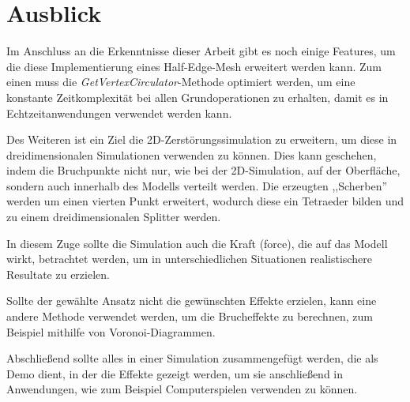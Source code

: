 \section{Ausblick}
Im Anschluss an die Erkenntnisse dieser Arbeit gibt es noch einige Features, um die diese Implementierung eines Half-Edge-Mesh erweitert werden kann. Zum einen muss die \textit{GetVertexCirculator}-Methode optimiert werden, um eine konstante Zeitkomplexit\"at bei allen Grundoperationen zu erhalten, damit es in Echtzeitanwendungen verwendet werden kann. 

Des Weiteren ist ein Ziel die 2D-Zerst\"orungssimulation zu erweitern, um diese in dreidimensionalen Simulationen verwenden zu k\"onnen. Dies kann geschehen, indem die Bruchpunkte nicht nur, wie bei der 2D-Simulation, auf der Oberfl\"ache, sondern auch innerhalb des Modells verteilt werden. Die erzeugten ,,Scherben'' werden um einen vierten Punkt erweitert, wodurch diese ein Tetraeder bilden und zu einem dreidimensionalen Splitter werden. 

In diesem Zuge sollte die Simulation auch die Kraft (force), die auf das Modell wirkt, betrachtet werden, um in unterschiedlichen Situationen realistischere Resultate zu erzielen.

Sollte der gew\"ahlte Ansatz nicht die gew\"unschten Effekte erzielen, kann eine andere Methode verwendet werden, um die Brucheffekte zu berechnen, zum Beispiel mithilfe von Voronoi-Diagrammen. 

Abschlie{\ss}end sollte alles in einer Simulation zusammengef\"ugt werden, die als Demo dient, in der die Effekte gezeigt werden, um sie anschlie{\ss}end in Anwendungen, wie zum Beispiel Computerspielen verwenden zu k\"onnen.